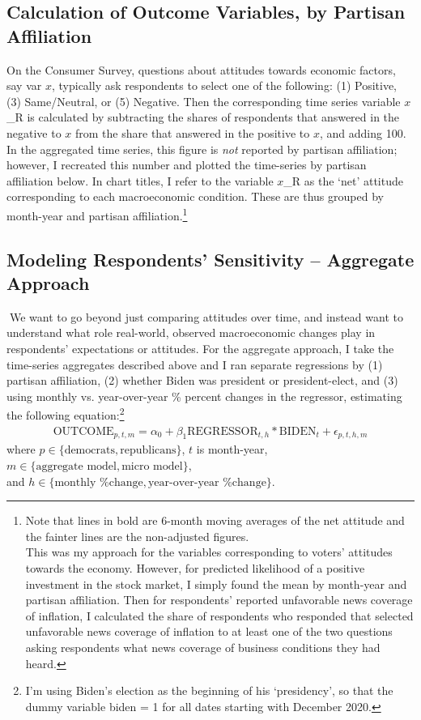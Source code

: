 \documentclass{article}
\begin{document}
\subsection{Calculation of Outcome Variables, by Partisan Affiliation}
On the Consumer Survey, questions about attitudes towards economic factors, say var $x$, typically ask respondents to select one of the following: (1) Positive, (3) Same/Neutral, or (5) Negative. Then the corresponding time series variable $x$\_R is calculated by subtracting the shares of respondents that answered in the negative to $x$ from the share that answered in the positive to $x$, and adding 100. In the aggregated time series, this figure is \textit{not} reported by partisan affiliation; however, I recreated this number and plotted the time-series by partisan affiliation below. In chart titles, I refer to the variable $x$\_R as the `net' attitude corresponding to each macroeconomic condition. These are thus grouped by month-year and partisan affiliation.\footnote{Note that lines in bold are 6-month moving averages of the net attitude and the fainter lines are the non-adjusted figures. \\ This was my approach for the variables corresponding to voters' attitudes towards the economy. However, for predicted likelihood of a positive investment in the stock market, I simply found the mean by month-year and partisan affiliation. Then for respondents' reported unfavorable news coverage of inflation, I calculated the share of respondents who responded that selected unfavorable news coverage of inflation to at least one of the two questions asking respondents what news coverage of business conditions they had heard.}

\subsection{Modeling Respondents' Sensitivity -- Aggregate Approach}
We want to go beyond just comparing attitudes over time, and instead want to understand what role real-world, observed macroeconomic changes play in respondents' expectations or attitudes. For the aggregate approach, I take the time-series aggregates described above and I ran separate regressions by (1) partisan affiliation,  (2) whether Biden was president or president-elect, and (3) using monthly vs. year-over-year \% percent changes in the regressor, estimating the following equation:\footnote{I'm using Biden's election as the beginning of his `presidency', so that the dummy variable biden = 1 for all dates starting with December 2020.}
\begin{gather} 
	\text{OUTCOME}_{p,t,m} = \alpha_0 + \beta_1 \text{REGRESSOR}_{t,h} *\text{BIDEN}_t + \epsilon_{p,t,h,m}
\end{gather} 
where $p \in \{\text{democrats}, \text{republicans}\}$, $t$ is month-year, $m \in \{\text{aggregate model}, \text{micro model}\}$, \\
and $h \in \{\text{monthly \% change}, \text{year-over-year \% change}\}$.
\end{document}
